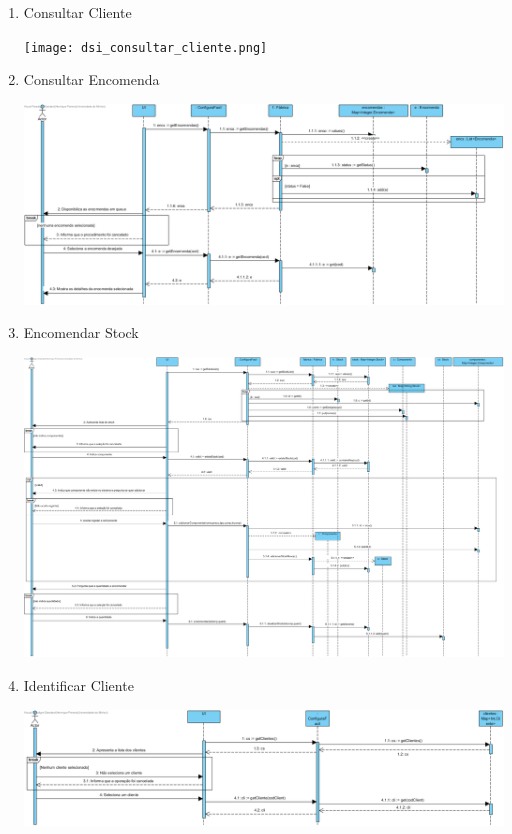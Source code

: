 \documentclass[11pt]{article} %
\begin{document}
\begin{enumerate}
\begin{center}
		\end{center}
	\item Consultar Cliente
		\begin{center}
 			\texttt{[image: dsi\_consultar\_cliente.png]}
		\end{center}
	\item Consultar Encomenda
		\begin{center}
 			\includegraphics[width = 6in]{dsi_consultar_encomenda.png}
		\end{center}
	\item Encomendar Stock
		\begin{center}
 			\includegraphics[width = 6in]{dsi_encomendar_stock.png}
		\end{center}
	\item Identificar Cliente
		\begin{center}
 			\includegraphics[width = 6in]{dsi_identificar_cliente.png}

\end{center}
\end{enumerate}
\end{document}
